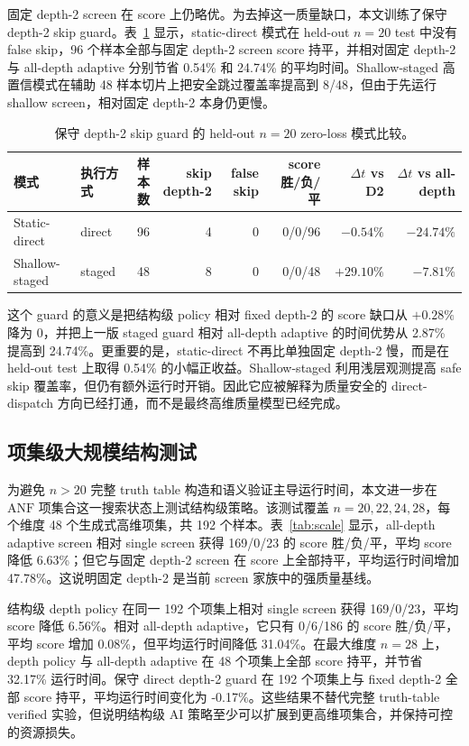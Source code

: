 \documentclass[UTF8,fontset=macnew,11pt]{ctexart}
\newcommand{\anf}{\ensuremath{\mathrm{ANF}}}
\begin{document}
固定 depth-2 screen 在 score 上仍略优。为去掉这一质量缺口，本文训练了保守 depth-2 skip guard。表~\ref{tab:guard} 显示，static-direct 模式在 held-out $n=20$ test 中没有 false skip，96 个样本全部与固定 depth-2 screen score 持平，并相对固定 depth-2 与 all-depth adaptive 分别节省 0.54\% 和 24.74\% 的平均时间。Shallow-staged 高置信模式在辅助 48 样本切片上把安全跳过覆盖率提高到 8/48，但由于先运行 shallow screen，相对固定 depth-2 本身仍更慢。

\begin{table}[t]
\centering
\scriptsize
\caption{保守 depth-2 skip guard 的 held-out $n=20$ zero-loss 模式比较。}
\label{tab:guard}
\begin{tabular}{llrrrrrr}
\toprule
模式 & 执行方式 & 样本数 & skip depth-2 & false skip & score 胜/负/平 & $\Delta t$ vs D2 & $\Delta t$ vs all-depth \\
\midrule
Static-direct & direct & 96 & 4 & 0 & 0/0/96 & $-0.54\%$ & $-24.74\%$ \\
Shallow-staged & staged & 48 & 8 & 0 & 0/0/48 & $+29.10\%$ & $-7.81\%$ \\
\bottomrule
\end{tabular}
\end{table}

这个 guard 的意义是把结构级 policy 相对 fixed depth-2 的 score 缺口从 $+0.28\%$ 降为 $0$，并把上一版 staged guard 相对 all-depth adaptive 的时间优势从 2.87\% 提高到 24.74\%。更重要的是，static-direct 不再比单独固定 depth-2 慢，而是在 held-out test 上取得 0.54\% 的小幅正收益。Shallow-staged 利用浅层观测提高 safe skip 覆盖率，但仍有额外运行时开销。因此它应被解释为质量安全的 direct-dispatch 方向已经打通，而不是最终高维质量模型已经完成。

\subsection{项集级大规模结构测试}

为避免 $n>20$ 完整 truth table 构造和语义验证主导运行时间，本文进一步在 \anf{} 项集合这一搜索状态上测试结构级策略。该测试覆盖 $n=20,22,24,28$，每个维度 48 个生成式高维项集，共 192 个样本。表~\ref{tab:scale} 显示，all-depth adaptive screen 相对 single screen 获得 169/0/23 的 score 胜/负/平，平均 score 降低 6.63\%；但它与固定 depth-2 screen 在 score 上全部持平，平均运行时间增加 47.78\%。这说明固定 depth-2 是当前 screen 家族中的强质量基线。

结构级 depth policy 在同一 192 个项集上相对 single screen 获得 169/0/23，平均 score 降低 6.56\%。相对 all-depth adaptive，它只有 0/6/186 的 score 胜/负/平，平均 score 增加 0.08\%，但平均运行时间降低 31.04\%。在最大维度 $n=28$ 上，depth policy 与 all-depth adaptive 在 48 个项集上全部 score 持平，并节省 32.17\% 运行时间。保守 direct depth-2 guard 在 192 个项集上与 fixed depth-2 全部 score 持平，平均运行时间变化为 -0.17\%。这些结果不替代完整 truth-table verified 实验，但说明结构级 AI 策略至少可以扩展到更高维项集合，并保持可控的资源损失。
\end{document}
